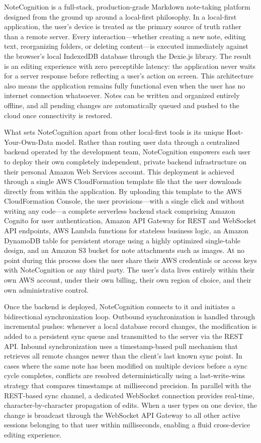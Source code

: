\documentclass[12pt, a4paper, oneside]{report}
\begin{document}
NoteCognition is a full-stack, production-grade Markdown note-taking platform designed from the ground up around a local-first philosophy. In a local-first application, the user's device is treated as the primary source of truth rather than a remote server. Every interaction---whether creating a new note, editing text, reorganizing folders, or deleting content---is executed immediately against the browser's local IndexedDB database through the Dexie.js library. The result is an editing experience with zero perceptible latency: the application never waits for a server response before reflecting a user's action on screen. This architecture also means the application remains fully functional even when the user has no internet connection whatsoever. Notes can be written and organized entirely offline, and all pending changes are automatically queued and pushed to the cloud once connectivity is restored.

What sets NoteCognition apart from other local-first tools is its unique Host-Your-Own-Data model. Rather than routing user data through a centralized backend operated by the development team, NoteCognition empowers each user to deploy their own completely independent, private backend infrastructure on their personal Amazon Web Services account. This deployment is achieved through a single AWS CloudFormation template file that the user downloads directly from within the application. By uploading this template to the AWS CloudFormation Console, the user provisions---with a single click and without writing any code---a complete serverless backend stack comprising Amazon Cognito for user authentication, Amazon API Gateway for REST and WebSocket API endpoints, AWS Lambda functions for stateless business logic, an Amazon DynamoDB table for persistent storage using a highly optimized single-table design, and an Amazon S3 bucket for note attachments such as images. At no point during this process does the user share their AWS credentials or access keys with NoteCognition or any third party. The user's data lives entirely within their own AWS account, under their own billing, their own region of choice, and their own administrative control.

Once the backend is deployed, NoteCognition connects to it and initiates a bidirectional synchronization loop. Outbound synchronization is handled through incremental pushes: whenever a local database record changes, the modification is added to a persistent sync queue and transmitted to the server via the REST API. Inbound synchronization uses a timestamp-based pull mechanism that retrieves all remote changes newer than the client's last known sync point. In cases where the same note has been modified on multiple devices before a sync cycle completes, conflicts are resolved deterministically using a last-write-wins strategy that compares timestamps at millisecond precision. In parallel with the REST-based sync channel, a dedicated WebSocket connection provides real-time, character-by-character propagation of edits. When a user types on one device, the change is broadcast through the WebSocket API Gateway to all other active sessions belonging to that user within milliseconds, enabling a fluid cross-device editing experience.
\end{document}
